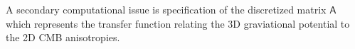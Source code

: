 \documentclass[11pt, letterpaper]{article}
\newcommand{\transfer}{\mathsf{A}}
\begin{document}
A secondary computational issue is specification of the discretized 
matrix $\transfer$ which represents the transfer function relating the 
3D graviational potential to the 2D CMB anisotropies.





\end{document}
